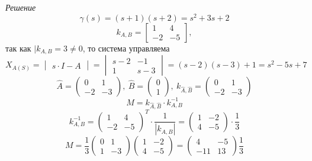 \documentclass[../../TAU.tex]{subfiles}
\begin{document}
    {\it Решение}
    $$
        \gamma(s)=(s+1)(s+2)=s^2+3s+2
    $$
    $$
        k_{A,B} = 
        \begin{bmatrix}
            1 & 4\\
            -2 & -5
        \end{bmatrix}
        ,
    $$
    так как $|k_{A,B}=3\neq0$, то система управляема
    $$
        X_{A(S)}=
        \begin{vmatrix}
            s\cdot I - A
        \end{vmatrix}
        =
        \begin{vmatrix}
            s-2 & -1\\
            1 & s-3
        \end{vmatrix}
        =(s-2)(s-3)+1 = s^2-5s+7
    $$
    $$
        \widehat A =
        \begin{pmatrix}
            0 & 1\\
            -2 & -3
        \end{pmatrix},\ 
        \widehat B=
        \begin{pmatrix}
            0 \\ 1
        \end{pmatrix},\ 
        k_{\widehat A,\widehat B} = 
        \begin{pmatrix}
            0 & 1\\
            -2 & -3
        \end{pmatrix}
    $$
    $$
        M = k_{\widehat A, \widehat B}\cdot k^{-1}_{A,B}
    $$
    $$
        k^{-1}_{A,B}=
        \begin{pmatrix}
            1 & 4\\
            -2 & -5
        \end{pmatrix}^{T}\cdot
        \frac{1}{|k_{A, B}|}
        =
        \begin{pmatrix}
            1 & -2\\
            4 & -5
        \end{pmatrix}\cdot
        \frac{1}{3}        
    $$
    $$
        M=\frac{1}{3}  
        \begin{pmatrix}
            0 & 1\\
            1 & -3
        \end{pmatrix}
        \begin{pmatrix}
            1 & -2\\
            4 & -5
        \end{pmatrix}
        =
        \begin{pmatrix}
            4 & -5\\
            -11 & 13
        \end{pmatrix}
        \frac{1}{3}  
    $$
\end{document}
